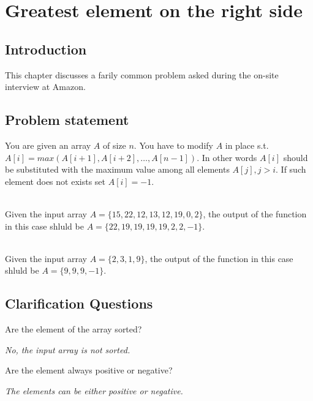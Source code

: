 %


\chapter{Greatest element on the right side}
\label{ch:greatest_right}
\section*{Introduction}
This chapter discusses a farily common problem asked during the on-site interview at Amazon.

\section{Problem statement}
\begin{exercise}
You are given an array $A$ of size $n$. You have to modify $A$ in place s.t. $A[i] = max(A[i+1], A[i+2],\ldots, A[n-1])$. In other words $A[i]$ should be substituted with  the maximum value among all elements $A[j], j > i$. If such element does not exists set $A[i] = -1$.
\end{exercise}


\begin{example}
	\hfill \\
	Given the input array $A = \{15, 22, 12, 13, 12, 19, 0, 2\}$, the output of the function in this case shluld be  $A = \{22, 19, 19, 19, 19, 2, 2, -1\}$.
\end{example}

\begin{example}
	\hfill \\
	Given the input array $A = \{2, 3, 1, 9\}$, the output of the function in this case shluld be  $A = \{9, 9, 9, -1\}$.
\end{example}



\section{Clarification Questions}

\begin{QandA}
	\item Are the element of the array sorted?
	\begin{answered}
		\textit{No, the input array is not sorted.}
	\end{answered}
	
	\item Are the element always positive or negative?
	\begin{answered}
		\textit{The elements can be either positive or negative.}
	\end{answered}
	
\end{QandA}

